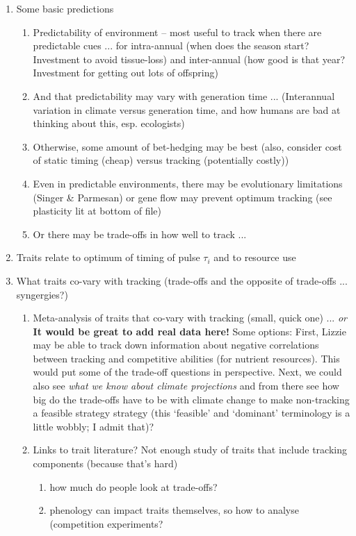 \documentclass[11pt,letterpaper]{article}
\begin{document}
\begin{enumerate}
\begin{enumerate}
\item Some basic predictions
\begin{enumerate}
\item Predictability of environment -- most useful to track when there are predictable cues ... for intra-annual (when does the season start? Investment to avoid tissue-loss) and inter-annual (how good is that year? Investment for getting out lots of offspring) 
\item And that predictability may vary with generation time ... (Interannual variation in climate versus generation time, and how humans are bad at thinking about this, esp. ecologists) %
\item Otherwise, some amount of bet-hedging may be best (also, consider cost of static timing (cheap) versus tracking (potentially costly))
\item Even in predictable environments, there may be evolutionary limitations (Singer \& Parmesan) or gene flow may prevent optimum tracking (see plasticity lit at bottom of file)
\item Or there may be trade-offs in how well to track ... 
\end{enumerate}
\item Traits relate to optimum of timing of pulse $\tau_{i}$  and to resource use 
\item What traits co-vary with tracking (trade-offs and the opposite of trade-offs ... syngergies?)
\begin{enumerate}
\item Meta-analysis of traits that co-vary with tracking (small, quick one) ... \emph{or} {\bf It would be great to add real data here!} Some options: First, Lizzie may be able to track down information about negative correlations between tracking and competitive abilities (for nutrient resources). This would put some of the trade-off questions in perspective. Next, we could also see  \emph{what we know about climate projections} and from there see how big do the trade-offs have to be with climate change to make non-tracking a feasible strategy strategy (this `feasible' and `dominant' terminology is a little wobbly; I admit that)? %
\item Links to trait literature? Not enough study of traits that include tracking components (because that's hard)
\begin{enumerate}
\item how much do people look at trade-offs?
\item phenology can impact traits themselves, so how to analyse (competition experiments?

\end{enumerate}
\end{enumerate}
\end{enumerate}
\end{enumerate}
\end{document}
